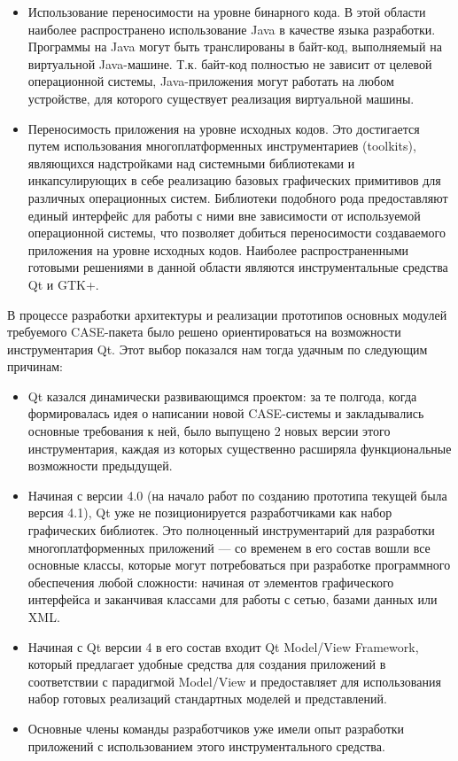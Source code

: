 \documentclass[a5paper]{article}
\begin{document}
\begin{itemize}
  \item Использование переносимости на уровне бинарного кода. В этой области
        наиболее распространено использование Java в
        качестве языка разработки. Программы на Java могут быть транслированы в
        байт-код, выполняемый на виртуальной Java-машине. Т.к. байт-код полностью не
        зависит от целевой операционной системы, Java-приложения могут работать
        на любом устройстве, для которого существует реализация виртуальной машины.
  \item Переносимость приложения на уровне исходных кодов. Это достигается путем
        использования многоплатформенных инструментариев
        (toolkits), являющихся надстройками над
        системными библиотеками и инкапсулирующих в себе реализацию базовых
        графических примитивов для различных операционных систем. Библиотеки
        подобного рода предоставляют единый интерфейс для работы с ними вне
        зависимости от используемой операционной системы, что позволяет
        добиться переносимости создаваемого приложения на уровне исходных
        кодов. Наиболее распространенными готовыми решениями в данной области
        являются инструментальные средства Qt и GTK+.
\end{itemize}

В процессе разработки архитектуры и реализации прототипов основных
модулей требуемого CASE-пакета было решено
ориентироваться на возможности инструментария
Qt. Этот выбор показался нам тогда удачным
по следующим причинам:

\begin{itemize}
  \item Qt казался динамически развивающимся
        проектом: за те полгода, когда формировалась идея о написании новой
        CASE-системы и закладывались основные
        требования к ней, было выпущено 2 новых версии этого инструментария,
        каждая из которых существенно расширяла функциональные возможности
        предыдущей.
  \item
        Начиная с версии 4.0 (на начало работ по созданию прототипа текущей была
        версия 4.1), Qt уже не позиционируется
        разработчиками как набор графических библиотек. Это полноценный
        инструментарий для разработки многоплатформенных приложений --- со
        временем в его состав вошли все основные классы, которые могут
        потребоваться при разработке программного обеспечения любой сложности:
        начиная от элементов графического интерфейса и заканчивая классами для
        работы с сетью, базами данных или XML.
  \item Начиная с Qt версии 4 в его состав входит Qt Model/View
        Framework, который предлагает удобные
        средства для создания приложений в соответствии с парадигмой
        Model/View и предоставляет для использования набор готовых реализаций стандартных
        моделей и представлений.
  \item Основные члены команды разработчиков уже имели опыт разработки
        приложений с использованием этого инструментального средства.
\end{itemize}
\end{document}
